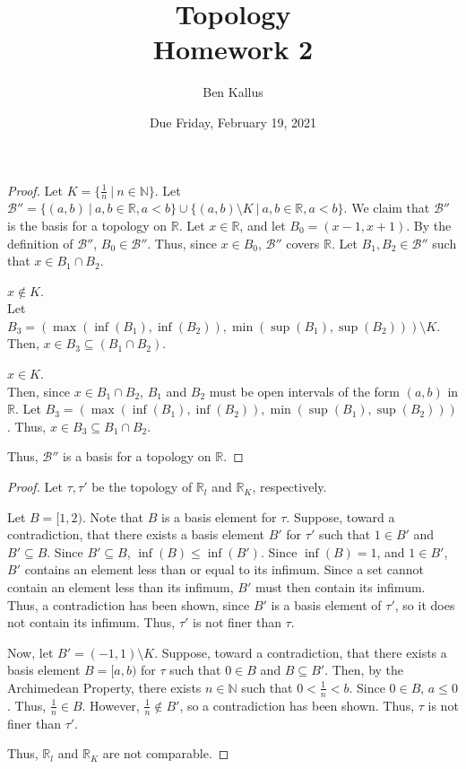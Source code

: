 \documentclass{article}
\date{Due Friday, February 19, 2021}
\author{Ben Kallus}
\title{Topology \\ Homework 2}
\newcommand{\R}{\mathbb R}
\newcommand{\N}{\mathbb N}
\newcommand{\B}{\mathcal B}
\begin{document}
\pagecolor{black}
\color{white}
\maketitle

\begin{proof}
    Let $K = \{\frac1n ~|~ n \in \N\}$.
    Let $\B'' = \{(a,b) ~|~ a,b \in \R, a < b\} \cup \{(a,b) \setminus K ~|~ a,b \in \R, a < b\}$.
    We claim that $\B''$ is the basis for a topology on $\R$.
    Let $x \in \R$, and let $B_0 = (x-1,x+1)$.
    By the definition of $\B''$, $B_0 \in \B''$.
    Thus, since $x \in B_0$, $\B''$ covers $\R$.
    Let $B_1, B_2 \in \B''$ such that $x \in B_1 \cap B_2$.
    
     $x \notin K$. \\
    \indent
    Let $B_3 = (\max(\inf(B_1), \inf(B_2)), \min(\sup(B_1), \sup(B_2))) \setminus K$.
    Then, $x \in B_3 \subseteq (B_1 \cap B_2)$.
    
     $x \in K$. \\
    \indent
    Then, since $x \in B_1 \cap B_2$, $B_1$ and $B_2$ must be open intervals of the form $(a,b)$ in $\R$.
    Let $B_3 = (\max(\inf(B_1), \inf(B_2)), \min(\sup(B_1), \sup(B_2)))$.
    Thus, $x \in B_3 \subseteq B_1 \cap B_2$.

    Thus, $\B''$ is a basis for a topology on $\R$.
\end{proof}

\bigskip
{}
\begin{proof}
    Let $\tau, \tau'$ be the topology of $\R_l$ and $\R_K$, respectively.

    Let $B = [1, 2)$.
    Note that $B$ is a basis element for $\tau$.
    Suppose, toward a contradiction, that there exists a basis element $B'$ for $\tau'$ such that $1 \in B'$ and $B' \subseteq B$.
    Since $B' \subseteq B$, $\inf(B) \leq \inf(B')$.
    Since $\inf(B) = 1$, and $1 \in B'$, $B'$ contains an element less than or equal to its infimum.
    Since a set cannot contain an element less than its infimum, $B'$ must then contain its infimum.
    Thus, a contradiction has been shown, since $B'$ is a basis element of $\tau'$, so it does not contain its infimum.
    Thus, $\tau'$ is not finer than $\tau$.


    Now, let $B' = (-1,1) \setminus K$.
    Suppose, toward a contradiction, that there exists a basis element $B = [a,b)$ for $\tau$ such that $0 \in B$ and $B \subseteq B'$.
    Then, by the Archimedean Property, there exists $n \in \N$ such that $0 < \frac1n < b$.
    Since $0 \in B$, $a \leq 0$.
    Thus, $\frac1n \in B$.
    However, $\frac1n \notin B'$, so a contradiction has been shown.
    Thus, $\tau$ is not finer than $\tau'$.

    Thus, $\R_l$ and $\R_K$ are not comparable.
\end{proof}

\bigskip
{}

\bigskip
{}
\end{document}
